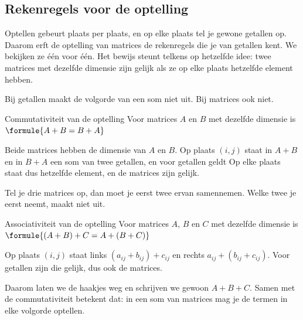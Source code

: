 \subsection{Rekenregels voor de optelling}

Optellen gebeurt plaats per plaats, en op elke plaats tel je gewone getallen op. Daarom erft de optelling van matrices de rekenregels die je van getallen kent. We bekijken ze één voor één. Het bewijs steunt telkens op hetzelfde idee: twee matrices met dezelfde dimensie zijn gelijk als ze op elke plaats hetzelfde element hebben.

Bij getallen maakt de volgorde van een som niet uit. Bij matrices ook niet.

\begin{theorie}
\begin{stelling}{Commutativiteit van de optelling}
Voor matrices $A$ en $B$ met dezelfde dimensie is \qquad $\formule{A + B = B + A}$
\end{stelling}

\begin{bewijs}
Beide matrices hebben de dimensie van $A$ en $B$. Op plaats $(i, j)$ staat in $A + B$ en in $B + A$ een som van twee getallen, en voor getallen geldt
Op elke plaats staat dus hetzelfde element, en de matrices zijn gelijk.
\end{bewijs}
\end{theorie}

Tel je drie matrices op, dan moet je eerst twee ervan samennemen. Welke twee je eerst neemt, maakt niet uit.

\begin{theorie}
\begin{stelling}{Associativiteit van de optelling}
Voor matrices $A$, $B$ en $C$ met dezelfde dimensie is \qquad $\formule{(A + B) + C = A + (B + C)}$
\end{stelling}

\begin{bewijs}
Op plaats $(i, j)$ staat links $(a_{ij} + b_{ij}) + c_{ij}$ en rechts $a_{ij} + (b_{ij} + c_{ij})$. Voor getallen zijn die gelijk, dus ook de matrices.
\end{bewijs}
\end{theorie}

Daarom laten we de haakjes weg en schrijven we gewoon $A + B + C$. Samen met de commutativiteit betekent dat: in een som van matrices mag je de termen in elke volgorde optellen.

